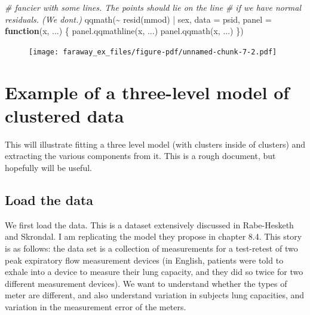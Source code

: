 \documentclass[
  letterpaper,
  DIV=11,
  numbers=noendperiod]{scrreprt}
\newenvironment{Shaded}{\begin{snugshade}}{\end{snugshade}}
\newcommand{\AttributeTok}[1]{\textcolor[rgb]{0.49,0.56,0.16}{#1}}
\newcommand{\CommentTok}[1]{\textcolor[rgb]{0.38,0.63,0.69}{\textit{#1}}}
\newcommand{\ControlFlowTok}[1]{\textcolor[rgb]{0.00,0.44,0.13}{\textbf{#1}}}
\newcommand{\FunctionTok}[1]{\textcolor[rgb]{0.02,0.16,0.49}{#1}}
\newcommand{\NormalTok}[1]{\textcolor[rgb]{0.00,0.44,0.13}{#1}}
\newcommand{\SpecialCharTok}[1]{\textcolor[rgb]{0.25,0.44,0.63}{#1}}
\begin{document}
\begin{Shaded}
\begin{Highlighting}[]
\CommentTok{\# fancier with some lines.  The points should lie on the line}
\CommentTok{\# if we have normal residuals.  (We don\textquotesingle{}t.)}
\FunctionTok{qqmath}\NormalTok{(}\SpecialCharTok{\textasciitilde{}} \FunctionTok{resid}\NormalTok{(mmod)  }\SpecialCharTok{|}\NormalTok{ sex, }\AttributeTok{data =}\NormalTok{ psid,}
       \AttributeTok{panel =} \ControlFlowTok{function}\NormalTok{(x, ...) \{}
           \FunctionTok{panel.qqmathline}\NormalTok{(x, ...)}
           \FunctionTok{panel.qqmath}\NormalTok{(x, ...)}
\NormalTok{       \})}
\end{Highlighting}
\end{Shaded}

\begin{figure}[H]

{\centering \texttt{[image: faraway\_ex\_files/figure-pdf/unnamed-chunk-7-2.pdf]}

}

\end{figure}

\hypertarget{example-of-a-three-level-model-of-clustered-data}{%
\chapter{Example of a three-level model of clustered
data}\label{example-of-a-three-level-model-of-clustered-data}}

This will illustrate fitting a three level model (with clusters inside
of clusters) and extracting the various components from it. This is a
rough document, but hopefully will be useful.

\hypertarget{load-the-data}{%
\section{Load the data}\label{load-the-data}}

We first load the data. This is a dataset extensively discussed in
Rabe-Hesketh and Skrondal. I am replicating the model they propose in
chapter 8.4. This story is as follows: the data set is a collection of
measurements for a test-retest of two peak expiratory flow measurement
devices (in English, patients were told to exhale into a device to
measure their lung capacity, and they did so twice for two different
measurement devices). We want to understand whether the types of meter
are different, and also understand variation in subjects lung
capacities, and variation in the measurement error of the meters.
\end{document}
